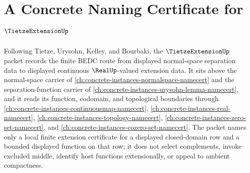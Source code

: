 \chapter{A Concrete Naming Certificate for $\TietzeExtensionUp$}
\label{ch:concrete-instances-tietze-extension-namecert}

Following Tietze, Urysohn, Kelley, and Bourbaki, the $\TietzeExtensionUp$ packet records the finite BEDC route from displayed normal-space separation data to displayed continuous $\RealUp$-valued extension data. It sits above the normal-space carrier of \autoref{ch:concrete-instances-normalspace-namecert} and the separation-function carrier of \autoref{ch:concrete-instances-urysohn-lemma-namecert}, and it reads its function, codomain, and topological boundaries through \autoref{ch:concrete-instances-continuousmap-namecert}, \autoref{ch:concrete-instances-real-namecert}, \autoref{ch:concrete-instances-topology-namecert}, \autoref{ch:concrete-instances-zero-set-namecert}, and \autoref{ch:concrete-instances-cozero-set-namecert}. The packet names only a local finite extension certificate for a displayed closed-domain row and a bounded displayed function on that row; it does not select complements, invoke excluded middle, identify host functions extensionally, or appeal to ambient compactness.

